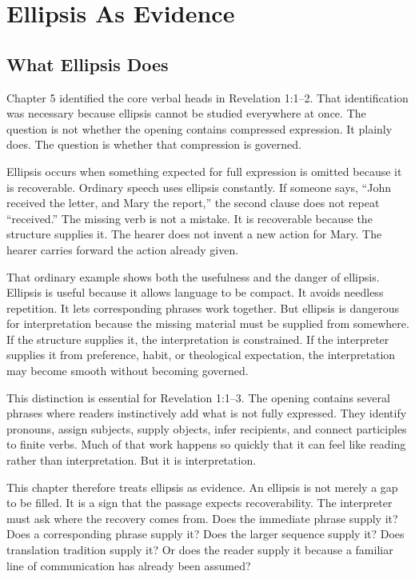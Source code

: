 \chapter{Ellipsis As Evidence}

\section{What Ellipsis Does}

Chapter 5 identified the core verbal heads in Revelation 1:1--2. That identification was necessary because ellipsis cannot be studied everywhere at once. The question is not whether the opening contains compressed expression. It plainly does. The question is whether that compression is governed.

Ellipsis occurs when something expected for full expression is omitted because it is recoverable. Ordinary speech uses ellipsis constantly. If someone says, ``John received the letter, and Mary the report,'' the second clause does not repeat ``received.'' The missing verb is not a mistake. It is recoverable because the structure supplies it. The hearer does not invent a new action for Mary. The hearer carries forward the action already given.

That ordinary example shows both the usefulness and the danger of ellipsis. Ellipsis is useful because it allows language to be compact. It avoids needless repetition. It lets corresponding phrases work together. But ellipsis is dangerous for interpretation because the missing material must be supplied from somewhere. If the structure supplies it, the interpretation is constrained. If the interpreter supplies it from preference, habit, or theological expectation, the interpretation may become smooth without becoming governed.

This distinction is essential for Revelation 1:1--3. The opening contains several phrases where readers instinctively add what is not fully expressed. They identify pronouns, assign subjects, supply objects, infer recipients, and connect participles to finite verbs. Much of that work happens so quickly that it can feel like reading rather than interpretation. But it is interpretation.

This chapter therefore treats ellipsis as evidence. An ellipsis is not merely a gap to be filled. It is a sign that the passage expects recoverability. The interpreter must ask where the recovery comes from. Does the immediate phrase supply it? Does a corresponding phrase supply it? Does the larger sequence supply it? Does translation tradition supply it? Or does the reader supply it because a familiar line of communication has already been assumed?

